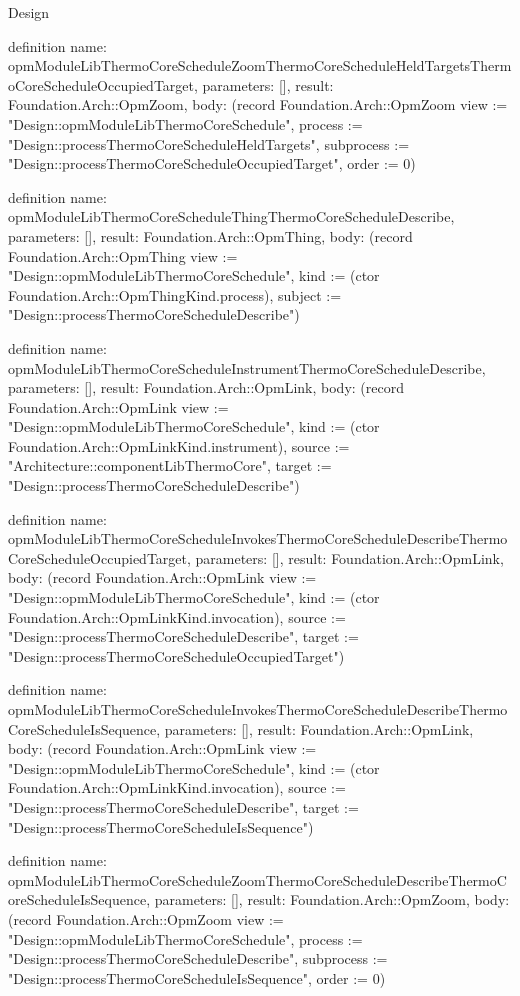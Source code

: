 \begin{lexlean}{Design}
\begin{semanticmodule}
definition{
  name: opmModuleLibThermoCoreScheduleZoomThermoCoreScheduleHeldTargetsThermoCoreScheduleOccupiedTarget,
  parameters: [],
  result: Foundation.Arch::OpmZoom,
  body: (record Foundation.Arch::OpmZoom {view := "Design::opmModuleLibThermoCoreSchedule", process := "Design::processThermoCoreScheduleHeldTargets", subprocess := "Design::processThermoCoreScheduleOccupiedTarget", order := 0})
}

definition{
  name: opmModuleLibThermoCoreScheduleThingThermoCoreScheduleDescribe,
  parameters: [],
  result: Foundation.Arch::OpmThing,
  body: (record Foundation.Arch::OpmThing {view := "Design::opmModuleLibThermoCoreSchedule", kind := (ctor Foundation.Arch::OpmThingKind.process), subject := "Design::processThermoCoreScheduleDescribe"})
}

definition{
  name: opmModuleLibThermoCoreScheduleInstrumentThermoCoreScheduleDescribe,
  parameters: [],
  result: Foundation.Arch::OpmLink,
  body: (record Foundation.Arch::OpmLink {view := "Design::opmModuleLibThermoCoreSchedule", kind := (ctor Foundation.Arch::OpmLinkKind.instrument), source := "Architecture::componentLibThermoCore", target := "Design::processThermoCoreScheduleDescribe"})
}

definition{
  name: opmModuleLibThermoCoreScheduleInvokesThermoCoreScheduleDescribeThermoCoreScheduleOccupiedTarget,
  parameters: [],
  result: Foundation.Arch::OpmLink,
  body: (record Foundation.Arch::OpmLink {view := "Design::opmModuleLibThermoCoreSchedule", kind := (ctor Foundation.Arch::OpmLinkKind.invocation), source := "Design::processThermoCoreScheduleDescribe", target := "Design::processThermoCoreScheduleOccupiedTarget"})
}

definition{
  name: opmModuleLibThermoCoreScheduleInvokesThermoCoreScheduleDescribeThermoCoreScheduleIsSequence,
  parameters: [],
  result: Foundation.Arch::OpmLink,
  body: (record Foundation.Arch::OpmLink {view := "Design::opmModuleLibThermoCoreSchedule", kind := (ctor Foundation.Arch::OpmLinkKind.invocation), source := "Design::processThermoCoreScheduleDescribe", target := "Design::processThermoCoreScheduleIsSequence"})
}

definition{
  name: opmModuleLibThermoCoreScheduleZoomThermoCoreScheduleDescribeThermoCoreScheduleIsSequence,
  parameters: [],
  result: Foundation.Arch::OpmZoom,
  body: (record Foundation.Arch::OpmZoom {view := "Design::opmModuleLibThermoCoreSchedule", process := "Design::processThermoCoreScheduleDescribe", subprocess := "Design::processThermoCoreScheduleIsSequence", order := 0})
}


\end{semanticmodule}
\end{lexlean}
